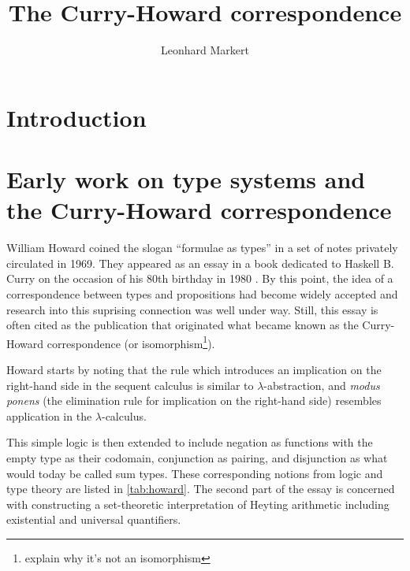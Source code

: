 \documentclass[12pt,toc=bibliography,numbers=noendperiod,
               footnotes=multiple,twoside]{scrartcl}
\title{The Curry-Howard correspondence}
\author{Leonhard Markert}
\begin{document}
\maketitle

\section{Introduction}


\section{Early work on type systems and the Curry-Howard correspondence}

William Howard coined the slogan \enquote{formulae as types} in a set of notes privately circulated in 1969. They appeared as an essay in a book dedicated to Haskell B. Curry on the occasion of his 80th birthday in 1980 \autocite{howard_formulae-as-types_1980}. By this point, the idea of a correspondence between types and propositions had become widely accepted and research into this suprising connection was well under way. Still, this essay is often cited as the publication that originated what became known as the Curry-Howard correspondence (or isomorphism\footnote{explain why it's not an isomorphism}).

Howard starts by noting that the rule which introduces an implication on the right-hand side in the sequent calculus is similar to \(\lambda\)-abstraction, and \emph{modus ponens} (the elimination rule for implication on the right-hand side) resembles application in the \(\lambda\)-calculus.

This simple
logic is then extended to include negation as functions with the empty type as their codomain, conjunction as pairing, and disjunction as what would today be called sum types. These corresponding notions from logic and type theory are listed in \cref{tab:howard}. The second part of the essay is concerned with constructing a set-theoretic interpretation of Heyting arithmetic including existential and universal quantifiers.
\end{document}
